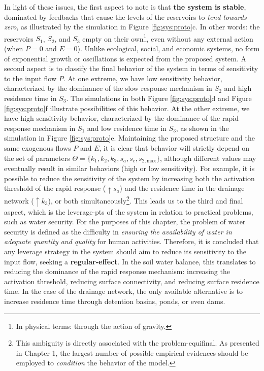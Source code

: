 \documentclass[./main_en.tex]{subfiles}
\begin{document}
\par In light of these issues, the first aspect to note is that \textbf{the \gls{system} is stable}, dominated by feedbacks that cause the levels of the reservoirs to \textit{tend towards zero}, as illustrated by the simulation in Figure \ref{fig:sys:proto}c. In other words: the reservoirs $S_1$, $S_2$, and $S_3$ empty on their own\footnote{In physical terms: through the action of gravity.}, even without any external action (when $P=0$ and $E=0$). Unlike ecological, social, and economic systems, no form of exponential growth or oscillations is expected from the proposed \gls{system}. A second aspect is to classify the final behavior of the \gls{system} in terms of sensitivity to the input flow $P$. At one extreme, we have low sensitivity behavior, characterized by the dominance of the slow response mechanism in $S_2$ and high residence time in $S_3$. The simulations in both Figure \ref{fig:sys:proto}d and Figure \ref{fig:sys:proto}f illustrate possibilities of this behavior. At the other extreme, we have high sensitivity behavior, characterized by the dominance of the rapid response mechanism in $S_1$ and low residence time in $S_3$, as shown in the simulation in Figure \ref{fig:sys:proto}e. Maintaining the proposed structure and the same exogenous flows $P$ and $E$, it is clear that behavior will strictly depend on the set of \gls{parameters} $\Theta = \{k_1, k_2, k_3, s_a, s_c, s_{2, \text{max}}\}$, although different values may eventually result in similar behaviors (high or low sensitivity). For example, it is possible to reduce the sensitivity of the \gls{system} by increasing both the activation threshold of the rapid response ($ \uparrow s_a$) and the residence time in the drainage network ($ \uparrow k_3$), or both simultaneously\footnote{This ambiguity is directly associated with the \gls{problem-equifinal}. As presented in Chapter 1, the largest number of possible empirical evidences should be employed to \textit{condition} the behavior of the \gls{model}.}. This leads us to the third and final aspect, which is the \gls{leverage-pts} of the \gls{system} in relation to practical problems, such as water security. For the purposes of this chapter, the problem of water security is defined as the difficulty in \textit{ensuring the availability of water in adequate quantity and quality} for human activities. Therefore, it is concluded that any leverage strategy in the \gls{system} should aim to reduce its sensitivity to the input flow, seeking a \textbf{\gls{regular-effect}}. In the soil water balance, this translates to reducing the dominance of the rapid response mechanism: increasing the activation threshold, reducing surface connectivity, and reducing surface residence time. In the case of the drainage network, the only available alternative is to increase residence time through detention basins, ponds, or even dams.
\end{document}
